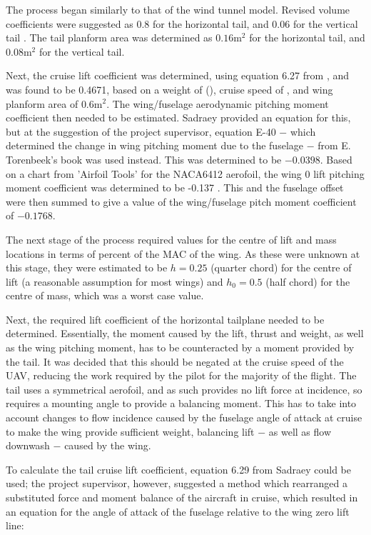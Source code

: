 \documentclass[../../main.tex]{subfiles}
\begin{document}
The process began similarly to that of the wind tunnel model.
Revised volume coefficients were suggested as 0.8 for the horizontal tail, and 0.06 for the vertical tail \cite{towell-19}.
The tail planform area was determined as $0.16 \mathrm{m^2}$ for the horizontal tail, and $0.08 \mathrm{m^2}$ for the vertical tail.  %

Next, the cruise lift coefficient was determined, using equation 6.27 from \cite{sadraey-13}, and was found to be 0.4671, based on a weight of  (), cruise speed of , and wing planform area of $0.6 \mathrm{m^2}$.
The wing/fuselage aerodynamic pitching moment coefficient then needed to be estimated.
Sadraey provided an equation for this, but at the suggestion of the project supervisor, equation E-40 $-$ which determined the change in wing pitching moment due to the fuselage $-$ from E. Torenbeek’s book \cite{torenbeek-76} was used instead.
This was determined to be $-0.0398$.
Based on a chart from 'Airfoil Tools' for the NACA6412 aerofoil, the wing 0 lift pitching moment coefficient was determined to be -0.137 \cite{airfoil-tools-19}.
This and the fuselage offset were then summed to give a value of the wing/fuselage pitch moment coefficient of $-0.1768.$ 

The next stage of the process required values for the centre of lift and mass locations in terms of percent of the MAC of the wing.
As these were unknown at this stage, they were estimated to be $h = 0.25$ (quarter chord) for the centre of lift (a reasonable assumption for most wings) and $h_0 = 0.5$ (half chord) for the centre of mass, which was a worst case value. 

Next, the required lift coefficient of the horizontal tailplane needed to be determined.
Essentially, the moment caused by the lift, thrust and weight, as well as the wing pitching moment, has to be counteracted by a moment provided by the tail.
It was decided that this should be negated at the cruise speed of the UAV, reducing the work required by the pilot for the majority of the flight.
The tail uses a symmetrical aerofoil, and as such provides no lift force at  incidence, so requires a mounting angle to provide a balancing moment.
This has to take into account changes to flow incidence caused by the fuselage angle of attack at cruise to make the wing provide sufficient weight, balancing lift $-$ as well as flow downwash $-$ caused by the wing. 

To calculate the tail cruise lift coefficient, equation 6.29 from Sadraey \cite{sadraey-13} could be used; the project supervisor, however, suggested a method which rearranged a substituted force and moment balance of the aircraft in cruise, which resulted in an equation for the angle of attack of the fuselage relative to the wing zero lift line: 
\end{document}
